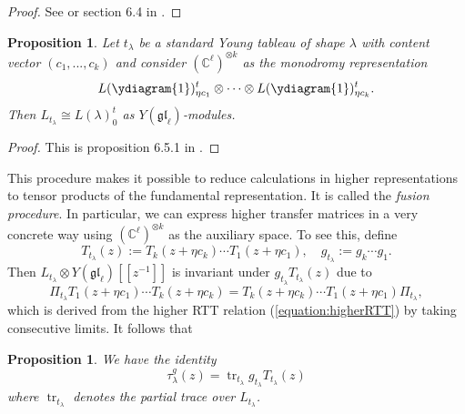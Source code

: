 \documentclass[11pt]{report}
\newtheorem{prop}[theorem]{Proposition}
\theoremstyle{definition}
\theoremstyle{remark}
\theoremstyle{remark}
\newcommand{\C}{\mathbb{C}}
\begin{document}
\begin{proof}
See \cite{article:molev:2008} or section 6.4 in \cite{book:molev}.
\end{proof}

\begin{prop}
Let $t_\lambda$ be a standard Young tableau of shape $\lambda$ with content vector $(c_1,...,c_k)$ and consider $(\C^\ell)^{\otimes k}$ as the monodromy representation
\begin{equation*}
L(\ydiagram{1})_{\eta c_1}^t \otimes \cdots \otimes L(\ydiagram{1})_{\eta c_k}^t.
\end{equation*}
Then $L_{t_\lambda} \cong L(\lambda)_0^t$ as $Y(\mathfrak{gl}_\ell)$-modules.
\end{prop}

\begin{proof}
This is proposition 6.5.1 in \cite{book:molev}.
\end{proof}

This procedure makes it possible to reduce calculations in higher representations to tensor products of the fundamental representation. It is called the \emph{fusion procedure}. In particular, we can express higher transfer matrices in a very concrete way using $(\C^\ell)^{\otimes k}$ as the auxiliary space. To see this, define
\begin{equation*}
T_{t_\lambda}(z) := T_k(z+\eta c_k) \cdots T_1(z+\eta c_1), \quad g_{t_\lambda} := g_k \cdots g_1.
\end{equation*}
Then $L_{t_\lambda} \otimes Y(\mathfrak{gl}_\ell)[[z^{-1}]]$ is invariant under $g_{t_\lambda} T_{t_\lambda}(z)$ due to
\begin{equation*}
\Pi_{t_\lambda} T_1(z+\eta c_1) \cdots T_k(z+\eta c_k) = T_k(z+\eta c_k) \cdots T_1(z+\eta c_1) \Pi_{t_\lambda},
\end{equation*}
which is derived from the higher RTT relation (\ref{equation:higherRTT}) by taking consecutive limits. It follows that

\begin{prop}
We have the identity
\begin{equation*}
\tau_\lambda^g(z) = \operatorname{tr}_{t_\lambda} g_{t_\lambda} T_{t_\lambda}(z)
\end{equation*}
where $\operatorname{tr}_{t_\lambda}$ denotes the partial trace over $L_{t_\lambda}$.
\end{prop}
\end{document}
